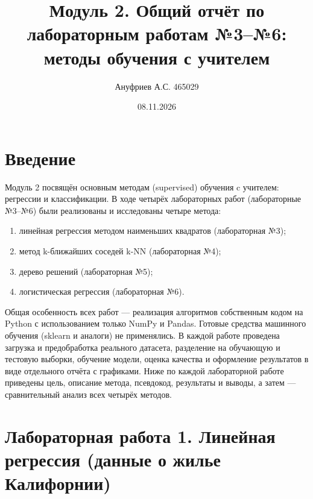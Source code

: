 \documentclass[12pt,a4paper]{article}
\title{Модуль 2. Общий отчёт по лабораторным работам №3--№6: методы обучения с учителем}
\author{Ануфриев А.С. 465029}
\date{08.11.2026}
\begin{document}
\maketitle
\tableofcontents
\newpage

\section{Введение}
Модуль 2 посвящён основным методам (supervised) обучения c учителем: регрессии и классификации. В ходе четырёх лабораторных работ (лабораторные №3--№6) были реализованы и исследованы четыре метода:

\begin{enumerate}
\item линейная регрессия методом наименьших квадратов (лабораторная №3);
\item метод k-ближайших соседей k-NN (лабораторная №4);
\item дерево решений (лабораторная №5);
\item логистическая регрессия (лабораторная №6).
\end{enumerate}

Общая особенность всех работ --- реализация алгоритмов собственным кодом на Python с использованием только NumPy и Pandas. Готовые средства машинного обучения (sklearn и аналоги) не применялись. В каждой работе проведена загрузка и предобработка реального датасета, разделение на обучающую и тестовую выборки, обучение модели, оценка качества и оформление результатов в виде отдельного отчёта с графиками. Ниже по каждой лабораторной работе приведены цель, описание метода, псевдокод, результаты и выводы, а затем --- сравнительный анализ всех четырёх методов.

\section{Лабораторная работа 1. Линейная регрессия (данные о жилье Калифорнии)}
\end{document}

